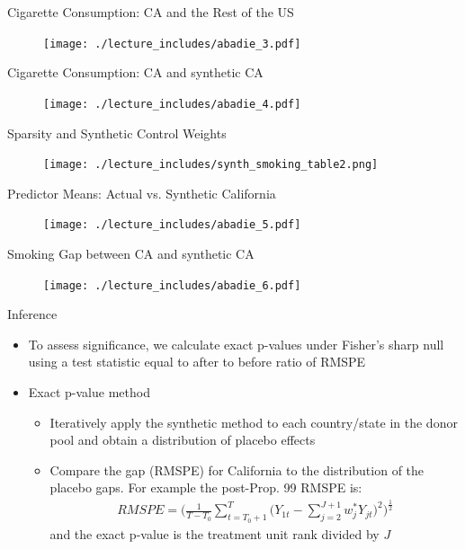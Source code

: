\documentclass{beamer}
\begin{document}
\begin{frame}{Cigarette Consumption: CA and the Rest of the US}
	
	\begin{figure}
	\texttt{[image: ./lecture\_includes/abadie\_3.pdf]}
	\end{figure}
\end{frame}

\begin{frame}{Cigarette Consumption: CA and synthetic CA}
	
	\begin{figure}
	\texttt{[image: ./lecture\_includes/abadie\_4.pdf]}
	\end{figure}
\end{frame}

\begin{frame}{Sparsity and Synthetic Control Weights}
	\begin{figure}
	\texttt{[image: ./lecture\_includes/synth\_smoking\_table2.png]}
	\end{figure}
\end{frame}



\begin{frame}{Predictor Means: Actual vs. Synthetic California}
	
	\begin{figure}
	\texttt{[image: ./lecture\_includes/abadie\_5.pdf]}
	\end{figure}
\end{frame}

\begin{frame}{Smoking Gap between CA and synthetic CA}
	
	\begin{figure}
	\texttt{[image: ./lecture\_includes/abadie\_6.pdf]}
	\end{figure}
\end{frame}

\begin{frame}{Inference}
	
	\begin{itemize}
	\item To assess significance, we calculate exact p-values under Fisher's sharp null using a test statistic equal to after to before ratio of RMSPE
	\item Exact p-value method
		\begin{itemize}
		\item Iteratively apply the synthetic method to each country/state in the donor pool and obtain a distribution of placebo effects
		\item Compare the gap (RMSPE) for California to the distribution of the placebo gaps. For example the post-Prop. 99 RMSPE is: 
			\begin{eqnarray*}
			RMSPE = \bigg(\frac{1}{T-T_0} \sum_{t=T_0+1}^T \bigg(Y_{1t} - \sum_{j=2}^{J+1} w_j^* Y_{jt}\bigg)^2 \bigg)^{\frac{1}{2}}
			\end{eqnarray*}and the exact p-value is the treatment unit rank divided by $J$
		\end{itemize}
	\end{itemize}
\end{frame}
\end{document}
